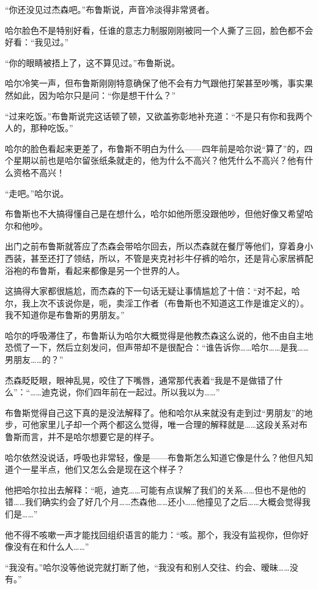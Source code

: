 \documentclass[../main]{subfiles}
\begin{document}
“你还没见过杰森吧。”布鲁斯说，声音冷淡得非常贤者。

哈尔脸色不是特别好看，任谁的意志力制服刚刚被同一个人撕了三回，脸色都不会好看：“我见过。”

“你的眼睛被捂上了，这不算见过。”布鲁斯说。

哈尔冷笑一声，但布鲁斯刚刚特意确保了他不会有力气跟他打架甚至吵嘴，事实果然如此，因为哈尔只是问：“你是想干什么？”

“过来吃饭。”布鲁斯说完这话顿了顿，又欲盖弥彰地补充道：“不是只有你和我两个人的，那种吃饭。”

哈尔的脸色看起来更差了，布鲁斯不明白为什么——四年前是哈尔说“算了”的，四个星期以前也是哈尔留张纸条就走的，他为什么不高兴？他凭什么不高兴？他有什么资格不高兴！

“走吧。”哈尔说。

布鲁斯也不大搞得懂自己是在想什么，哈尔如他所愿没跟他吵，但他好像又希望哈尔和他吵。

出门之前布鲁斯就答应了杰森会带哈尔回去，所以杰森就在餐厅等他们，穿着身小西装，甚至还打了领结，所以，不管是夹克衬衫牛仔裤的哈尔，还是背心家居裤配浴袍的布鲁斯，看起来都像是另一个世界的人。

这搞得大家都很尴尬，而杰森的下一句话无疑让事情尴尬了十倍：“对不起，哈尔，我上次不该说你是，呃，卖淫工作者（布鲁斯也不知道这工作是谁定义的）。我不知道你是布鲁斯的男朋友。”

哈尔的呼吸滞住了，布鲁斯认为哈尔大概觉得是他教杰森这么说的，他不由自主地恐慌了一下，然后立刻发问，但声带却不是很配合：“谁告诉你……哈尔……是我……男朋友……的？”

杰森眨眨眼，眼神乱晃，咬住了下嘴唇，通常那代表着“我是不是做错了什么”：“……迪克说，你们四年前在一起过。所以我以为\ldots\ldots”

布鲁斯觉得自己这下真的是没法解释了。他和哈尔从来就没有走到过“男朋友”的地步，可他家里儿子却一个两个都这么觉得，唯一合理的解释就是……这段关系对布鲁斯而言，并不是哈尔想要它是的样子。

哈尔依然没说话，呼吸也非常轻，像是——布鲁斯怎么知道它像是什么？他但凡知道个一星半点，他们又怎么会是现在这个样子？

他把哈尔拉出去解释：“呃，迪克……可能有点误解了我们的关系……但也不是他的错……我们确实约会了好几个月……杰森他……还小……他撞见了之后……大概会觉得我们是\ldots\ldots”

他不得不咳嗽一声才能找回组织语言的能力：“咳。那个，我没有监视你，但你好像没有在和什么人\ldots\ldots”

“我没有。”哈尔没等他说完就打断了他，“我没有和别人交往、约会、暧昧……没有。”
\end{document}
